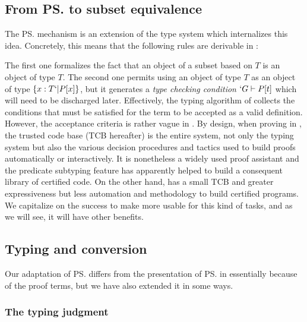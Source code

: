 \documentclass[twocolumn]{article}
\begin{document}
\subsection{From \ps{} to subset equivalence}
The \ps{} mechanism \cite{Rushby98:TSE, Shankar&Owre:WADT99}
is an extension of the \PVS type system which internalizes this idea.
Concretely, this means that the following rules are derivable in \PVS:
\begin{figure}[h]
  \begin{center}
    \DP
    \DP
  \end{center}
  \vspace{-1em}
  \label{PVS:rules}
  \caption{\PVS}
\end{figure}

The first one formalizes the fact that an object of a subset based on
$T$ is an object of type $T$. The second one permits using an object of
type $T$ as an object of type $\{ x : T `| P[x] \}$, but it generates a
\emph{type checking condition} $`G \vdash P[t]$ which will need to be
discharged later. Effectively, the typing algorithm of \PVS{} collects
the conditions that must be satisfied for the term to be accepted as a
valid definition. However, the acceptance criteria is rather vague in
\PVS{}. By design, when proving in \PVS{}, the trusted code base (TCB
hereafter) is the entire system, not only the typing system but also the
various decision procedures and tactics used to build proofs
automatically or interactively. It is nonetheless a widely used proof
assistant and the predicate subtyping feature has apparently helped to
build a consequent library of certified code. On the other hand, \Coq
has a small TCB and greater expressiveness but less automation and
methodology to build certified programs. We capitalize on the \PVS
success to make \Coq more usable for this kind of tasks, and as we will see,
it will have other benefits.

\subsection{Typing and conversion}
Our adaptation of \ps{} differs from the presentation of
\ps{} in \cite{Rushby98:TSE, Shankar&Owre:WADT99} essentially because of the
proof terms, but we have also extended it in some ways. 

\subsubsection{The typing judgment}
\end{document}
